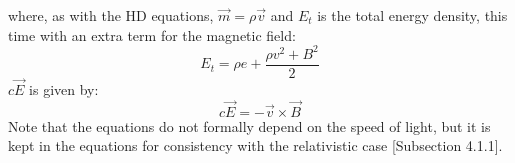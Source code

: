 where, as with the HD equations, $\vec{m}=\rho\vec{v}$ and $E_t$ is the total energy density, this time with an extra term for the magnetic field:
\begin{equation*}
	E_t = \rho e + \frac{\rho v^2 + B^2}{2}
\end{equation*}
$c\vec{E}$ is given by:
\begin{equation*}
	c\vec{E} = -\vec{v}\times \vec{B}
\end{equation*}
Note that the equations do not formally depend on the speed of light, but it is kept in the equations for consistency with the relativistic case \cite{notes-principles-MHD}[Subsection 4.1.1].